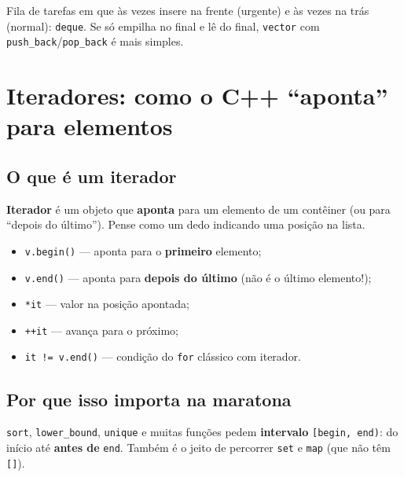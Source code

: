 \begin{exemplodiabox}
Fila de tarefas em que às vezes insere na frente (urgente) e às vezes na trás (normal): \texttt{deque}. Se só empilha no final e lê do final, \texttt{vector} com \texttt{push\_back}/\texttt{pop\_back} é mais simples.
\end{exemplodiabox}


\section{Iteradores: como o C++ ``aponta'' para elementos}

\subsection{O que é um iterador}

\textbf{Iterador} é um objeto que \textbf{aponta} para um elemento de um contêiner (ou para ``depois do último'').
Pense como um dedo indicando uma posição na lista.

\begin{itemize}[nosep]
  \item \texttt{v.begin()} --- aponta para o \textbf{primeiro} elemento;
  \item \texttt{v.end()} --- aponta para \textbf{depois do último} (não é o último elemento!);
  \item \texttt{*it} --- valor na posição apontada;
  \item \texttt{++it} --- avança para o próximo;
  \item \texttt{it != v.end()} --- condição do \texttt{for} clássico com iterador.
\end{itemize}

\subsection{Por que isso importa na maratona}

\texttt{sort}, \texttt{lower\_bound}, \texttt{unique} e muitas funções pedem \textbf{intervalo} \texttt{[begin, end)}: do início até \textbf{antes de} \texttt{end}.
Também é o jeito de percorrer \texttt{set} e \texttt{map} (que não têm \texttt{[]}).


